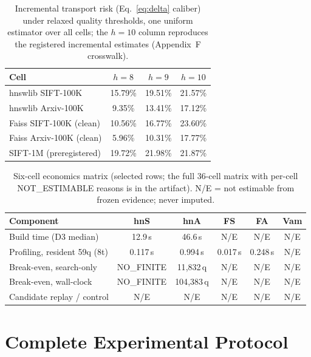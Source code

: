 \documentclass{article}
\begin{document}
\begin{table}[t]
\centering
\caption{Incremental transport risk (Eq.~\ref{eq:delta} caliber) under relaxed quality thresholds, one
uniform estimator over all cells; the $h{=}10$ column reproduces the registered incremental estimates
(Appendix~F crosswalk).}
\label{tab:hsens}
\footnotesize
\setlength{\tabcolsep}{4pt}
\begin{tabular}{lccc}
\toprule
Cell & $h{=}8$ & $h{=}9$ & $h{=}10$ \\
\midrule
hnswlib SIFT-100K & 15.79\% & 19.51\% & 21.57\% \\
hnswlib Arxiv-100K & 9.35\% & 13.41\% & 17.12\% \\
Faiss SIFT-100K (clean) & 10.56\% & 16.77\% & 23.60\% \\
Faiss Arxiv-100K (clean) & 5.96\% & 10.31\% & 17.77\% \\
SIFT-1M (preregistered) & 19.72\% & 21.98\% & 21.87\% \\
\bottomrule
\end{tabular}
\end{table}

\begin{table}[t]
\centering
\caption{Six-cell economics matrix (selected rows; the full 36-cell matrix with per-cell NOT\_ESTIMABLE
reasons is in the artifact). N/E = not estimable from frozen evidence; never imputed.}
\label{tab:economics}
\footnotesize
\setlength{\tabcolsep}{3.4pt}
\begin{tabular}{lccccc}
\toprule
Component & hnS & hnA & FS & FA & Vam \\
\midrule
Build time (D3 median) & 12.9\,s & 46.6\,s & N/E & N/E & N/E \\
Profiling, resident 59q (8t) & 0.117\,s & 0.994\,s & 0.017\,s & 0.248\,s & N/E \\
Break-even, search-only & NO\_FINITE & 11{,}832\,q & N/E & N/E & N/E \\
Break-even, wall-clock & NO\_FINITE & 104{,}383\,q & N/E & N/E & N/E \\
Candidate replay / control & N/E & N/E & N/E & N/E & N/E \\
\bottomrule
\end{tabular}
\end{table}

\section{Complete Experimental Protocol}
\label{app:protocol}
\end{document}

